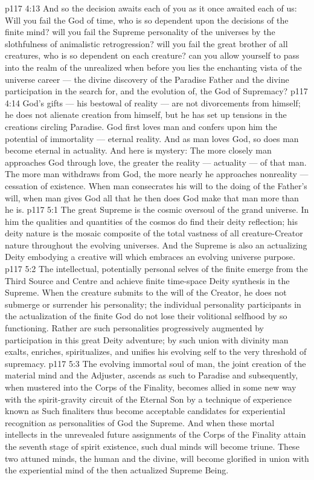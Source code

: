 \vs p117 4:13 And so the decision awaits each of you as it once awaited each of us: Will you fail the God of time, who is so dependent upon the decisions of the finite mind? will you fail the Supreme personality of the universes by the slothfulness of animalistic retrogression? will you fail the great brother of all creatures, who is so dependent on each creature? can you allow yourself to pass into the realm of the unrealized when before you lies the enchanting vista of the universe career --- the divine discovery of the Paradise Father and the divine participation in the search for, and the evolution of, the God of Supremacy?
\vs p117 4:14 \pc God’s gifts --- his bestowal of reality --- are not divorcements from himself; he does not alienate creation from himself, but he has set up tensions in the creations circling Paradise. God first loves man and confers upon him the potential of immortality --- eternal reality. And as man loves God, so does man become eternal in actuality. And here is mystery: The more closely man approaches God through love, the greater the reality --- actuality --- of that man. The more man withdraws from God, the more nearly he approaches nonreality --- cessation of existence. When man consecrates his will to the doing of the Father’s will, when man gives God all that he  then does God make that man more than he is.
\vs p117 5:1 The great Supreme is the cosmic oversoul of the grand universe. In him the qualities and quantities of the cosmos do find their deity reflection; his deity nature is the mosaic composite of the total vastness of all creature\hyp{}Creator nature throughout the evolving universes. And the Supreme is also an actualizing Deity embodying a creative will which embraces an evolving universe purpose.
\vs p117 5:2 The intellectual, potentially personal selves of the finite emerge from the Third Source and Centre and achieve finite time\hyp{}space Deity synthesis in the Supreme. When the creature submits to the will of the Creator, he does not submerge or surrender his personality; the individual personality participants in the actualization of the finite God do not lose their volitional selfhood by so functioning. Rather are such personalities progressively augmented by participation in this great Deity adventure; by such union with divinity man exalts, enriches, spiritualizes, and unifies his evolving self to the very threshold of supremacy.
\vs p117 5:3 \pc The evolving immortal soul of man, the joint creation of the material mind and the Adjuster, ascends as such to Paradise and subsequently, when mustered into the Corps of the Finality, becomes allied in some new way with the spirit\hyp{}gravity circuit of the Eternal Son by a technique of experience known as  Such finaliters thus become acceptable candidates for experiential recognition as personalities of God the Supreme. And when these mortal intellects in the unrevealed future assignments of the Corps of the Finality attain the seventh stage of spirit existence, such dual minds will become triune. These two attuned minds, the human and the divine, will become glorified in union with the experiential mind of the then actualized Supreme Being.
